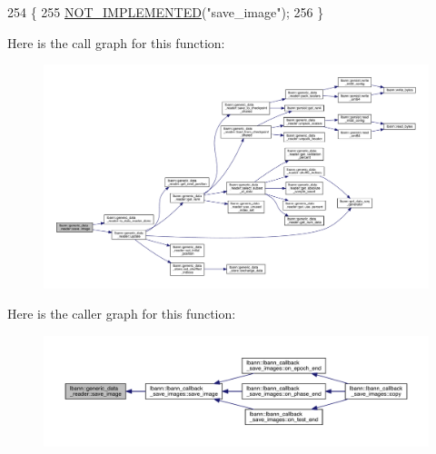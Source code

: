 \begin{DoxyCode}
254                                                          \{
255     \hyperlink{data__reader_8hpp_a10d485225119e927ae18857acf81bdc6}{NOT\_IMPLEMENTED}(\textcolor{stringliteral}{"save\_image"});
256   \}
\end{DoxyCode}
Here is the call graph for this function\+:\nopagebreak
\begin{figure}[H]
\begin{center}
\leavevmode
\includegraphics[width=350pt]{classlbann_1_1generic__data__reader_a8cf298061c73f55e2fe717acd2a9f178_cgraph}
\end{center}
\end{figure}
Here is the caller graph for this function\+:\nopagebreak
\begin{figure}[H]
\begin{center}
\leavevmode
\includegraphics[width=350pt]{classlbann_1_1generic__data__reader_a8cf298061c73f55e2fe717acd2a9f178_icgraph}
\end{center}
\end{figure}
\mbox{\label{classlbann_1_1generic__data__reader_a6f49d945610f35335fce4a422a432cc1}} 
